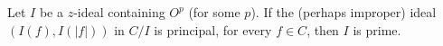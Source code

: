 Let $I$ be a $z$-ideal containing $O^p$ (for some $p$). If the (perhaps improper) ideal $(I(f), I(|f|))$ in $C/I$ is principal, for every $f \in C$, then $I$ is prime.
